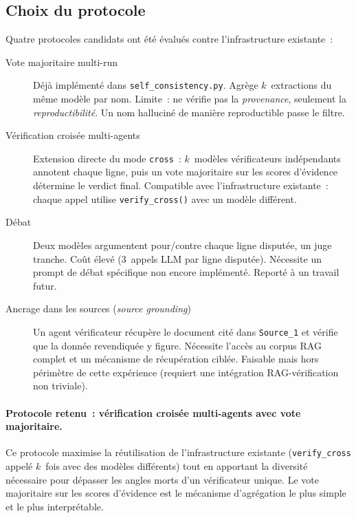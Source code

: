 \subsection{Choix du protocole}\label{sec:protocol-choice}

Quatre protocoles candidats ont \'et\'e \'evalu\'es contre l'infrastructure
existante~:

\begin{description}
\item[Vote majoritaire multi-run] D\'ej\`a impl\'ement\'e dans
  \texttt{self\_consistency.py}. Agr\`ege $k$~extractions du m\^eme mod\`ele par
  nom. Limite~: ne v\'erifie pas la \emph{provenance}, seulement la
  \emph{reproductibilit\'e}. Un nom hallucin\'e de mani\`ere reproductible passe le
  filtre.

\item[V\'erification crois\'ee multi-agents] Extension directe du mode
  \texttt{cross}~: $k$~mod\`eles v\'erificateurs ind\'ependants annotent chaque
  ligne, puis un vote majoritaire sur les scores d'\'evidence d\'etermine le
  verdict final. Compatible avec l'infrastructure existante~: chaque appel
  utilise \texttt{verify\_cross()} avec un mod\`ele diff\'erent.

\item[D\'ebat] Deux mod\`eles argumentent pour/contre chaque ligne disput\'ee,
  un juge tranche. Co\^ut \'elev\'e (3~appels LLM par ligne disput\'ee).
  N\'ecessite un prompt de d\'ebat sp\'ecifique non encore impl\'ement\'e.
  Report\'e \`a un travail futur.

\item[Ancrage dans les sources (\emph{source grounding})] Un agent
  v\'erificateur r\'ecup\`ere le document cit\'e dans \texttt{Source\_1} et v\'erifie
  que la donn\'ee revendiqu\'ee y figure. N\'ecessite l'acc\`es au corpus RAG
  complet et un m\'ecanisme de r\'ecup\'eration cibl\'ee. Faisable mais hors
  p\'erim\`etre de cette exp\'erience (requiert une int\'egration RAG-v\'erification
  non triviale).
\end{description}

\paragraph{Protocole retenu~: v\'erification crois\'ee multi-agents avec vote
majoritaire.}
Ce protocole maximise la r\'eutilisation de l'infrastructure existante
(\texttt{verify\_cross} appel\'e $k$~fois avec des mod\`eles diff\'erents) tout en
apportant la diversit\'e n\'ecessaire pour d\'epasser les angles morts d'un
v\'erificateur unique. Le vote majoritaire sur les scores d'\'evidence est le
m\'ecanisme d'agr\'egation le plus simple et le plus interpr\'etable.

